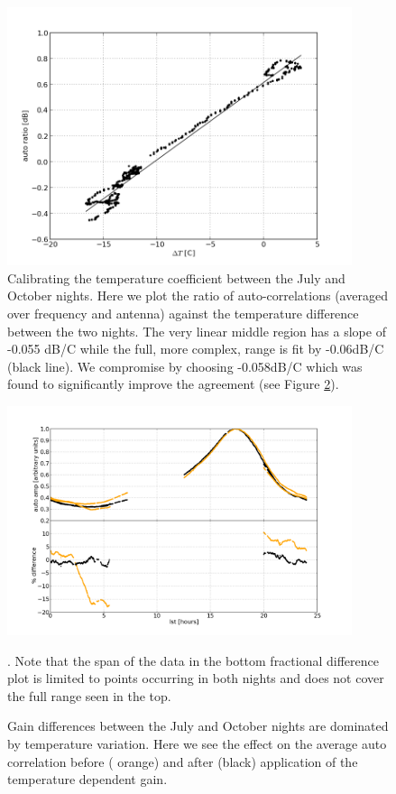 \documentclass[preprint]{aastex}
\begin{document}
\begin{figure}
\includegraphics[width=0.9\textwidth]{plots/auto_tempcorr.png}
\caption{Calibrating the temperature coefficient  between the July and October nights.  Here we plot the ratio of auto-correlations (averaged over frequency and antenna) against the temperature difference between the two nights. The very linear middle region has a slope of  -0.055 dB/C while the full, more complex, range is fit by -0.06dB/C (black line).  We compromise by choosing -0.058dB/C   
which was found to significantly improve the agreement (see Figure \ref{fig:auto_compare}).
\label{fig:autos_tempcorr}}
\end{figure}

\begin{figure}
\includegraphics[width=0.9\textwidth]{plots/auto_balance.png}
\caption{Gain differences between the July and October nights are dominated by temperature variation. Here we see the effect on 
the average auto correlation before ({\color{orange} orange}) and after (black) application of the temperature dependent gain. \label{fig:auto_compare}}.   Note that the span of the data in the bottom fractional difference plot is limited to points occurring in both nights and does not cover the full range seen in the top.
\end{figure}
\end{document}
